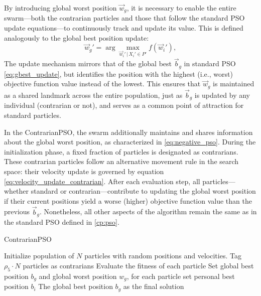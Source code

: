 {By introducing global worst position  $\vec{w}_g$, it is necessary to enable the entire swarm---both the contrarian particles and those that follow the standard PSO update equations---to continuously track and update its value. This is defined analogously to the global best position update:
\begin{equation}
    \vec{w}_g' = \arg\max_{\vec{w}_i'\,|\, X_i' \in P'} f(\vec{w}_i'),
    \label{eq:gworst_update}
\end{equation}
The update mechanism mirrors that of the global best $\vec{b}_g$ in standard PSO \eqref{eq:gbest_update}, but identifies the position with the highest (i.e., worst) objective function value instead of the lowest. This ensures that $\vec{w}_g$ is maintained as a shared landmark across the entire population, just as $\vec{b}_g$ is updated by any individual (contrarian or not), and serves as a common point of attraction for standard particles.

In the ContrarianPSO, the swarm additionally maintains and shares information about the global worst position, as characterized in \eqref{eq:negative_pso}. During the initialization phase, a fixed fraction of particles is designated as contrarians. These contrarian particles follow an alternative movement rule in the search space: their velocity update is governed by equation \eqref{eq:velocity_update_contrarian}. After each evaluation step, all particles—whether standard or contrarian—contribute to updating the global worst position if their current positions yield a worse (higher) objective function value than the previous $\vec{b}_g$. Nonetheless, all other aspects of the algorithm remain the same as in the standard PSO defined in \autoref{cp:pso}.


\begin{algorithm}[H]
\caption{ContrarianPSO}\label{alg:contrarian}
Initialize population of \(N\) particles with random positions and velocities. Tag \(\rho_5 \cdot N\) particles as contrarians\;
Evaluate the fitness of each particle\;
Set global best position \(b_g\) and global worst position \(w_g\), for each particle set personal best position \(b_i\)\;
\Return The global best position \(b_g\) as the final solution\;
\end{algorithm}

}
